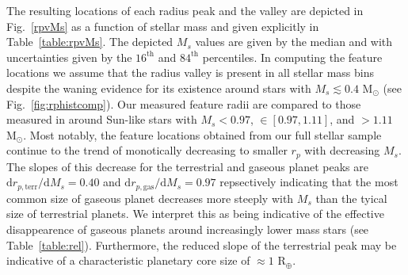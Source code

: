 \documentclass[twocolumn]{emulateapj}
\begin{document}


The resulting locations of each radius peak and the valley are depicted in Fig.~\ref{rpvMs} as a function of
stellar mass and given explicitly in Table~\ref{table:rpvMs}. The depicted $M_s$ values are given by the median and 
with uncertainties given by the $16^{\text{th}}$ and  $84^{\text{th}}$ percentiles. In computing the
feature locations we assume that the radius valley is present in all stellar mass bins despite the waning
evidence for its existence around stars with $M_s \lesssim 0.4$ M$_{\odot}$ (see Fig.~\ref{fig:rphistcomp}).
Our measured feature radii are compared to those measured in \cite{fulton18} around Sun-like stars with
$M_s <0.97$, $\in [0.97,1.11]$, and $>1.11$ M$_{\odot}$.
Most notably, the feature locations obtained from our full stellar sample continue to the trend of monotically
decreasing  to smaller $r_p$ with decreasing $M_s$. The slopes of this decrease for the terrestrial and gaseous
planet peaks are $\text{d}r_{p,\text{terr}} / \text{d}M_s = 0.40$ and $\text{d}r_{p,\text{gas}} / \text{d}M_s = 0.97$
repsectively indicating that the most common size of
gaseous planet decreases more steeply with $M_s$ than the tyical size of terrestrial planets. We interpret this
as being indicative of the effective disappearence of gaseous planets around increasingly lower mass stars
(see Table~\ref{table:rel}). Furthermore, the reduced slope of the terrestrial peak may be indicative of
a characteristic planetary core size of $\approx 1$ R$_{\oplus}$. 


\end{document}
